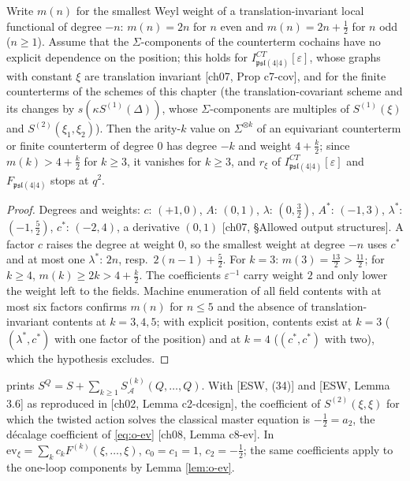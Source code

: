 \begin{lemma}
\label{lem:o-actiontrunc}
Write $m(n)$ for the smallest Weyl weight of a translation-invariant local functional of degree $-n$: $m(n)=2n$ for $n$ even and $m(n)=2n+\tfrac12$ for $n$ odd ($n\ge1$). Assume that the $\Sigma$-components of the counterterm cochains have no explicit dependence on the position; this holds for $I^{CT}_{\mathfrak{psl}(4|4)}[\varepsilon]$, whose graphs with constant $\xi$ are translation invariant [ch07, Prop c7-cov], and for the finite counterterms of the schemes of this chapter (the translation-covariant scheme and its changes by $s(\kappa S^{(1)}(\Delta))$, whose $\Sigma$-components are multiples of $S^{(1)}(\xi)$ and $S^{(2)}(\xi_1,\xi_2)$). Then the arity-$k$ value on $\Sigma^{\otimes k}$ of an equivariant counterterm or finite counterterm of degree $0$ has degree $-k$ and weight $4+\tfrac k2$; since $m(k)>4+\tfrac k2$ for $k\ge3$, it vanishes for $k\ge3$, and $r_\xi$ of $I^{CT}_{\mathfrak{psl}(4|4)}[\varepsilon]$ and $F_{\mathfrak{psl}(4|4)}$ stops at $q^2$.
\end{lemma}

\begin{proof}
Degrees and weights: $c$: $(+1,0)$, $A$: $(0,1)$, $\lambda$: $(0,\tfrac32)$, $A^*$: $(-1,3)$, $\lambda^*$: $(-1,\tfrac52)$, $c^*$: $(-2,4)$, a derivative $(0,1)$ [ch07, §Allowed output structures]. A factor $c$ raises the degree at weight $0$, so the smallest weight at degree $-n$ uses $c^*$ and at most one $\lambda^*$: $2n$, resp.\ $2(n-1)+\tfrac52$. For $k=3$: $m(3)=\tfrac{13}{2}>\tfrac{11}2$; for $k\ge4$, $m(k)\ge2k>4+\tfrac k2$. The coefficients $\varepsilon^{-1}$ carry weight $2$ and only lower the weight left to the fields. Machine enumeration of all field contents with at most six factors confirms $m(n)$ for $n\le5$ and the absence of translation-invariant contents at $k=3,4,5$; with explicit position, contents exist at $k=3$ ($(\lambda^*,c^*)$ with one factor of the position) and at $k=4$ ($(c^*,c^*)$ with two), which the hypothesis excludes.
\end{proof}

\begin{remark} prints $S^Q=S+\sum_{k\ge1}S^{(k)}_{\mathcal A}(Q,\dots,Q)$. With [ESW, (34)] and [ESW, Lemma 3.6] as reproduced in [ch02, Lemma c2-dcesign], the coefficient of $S^{(2)}(\xi,\xi)$ for which the twisted action solves the classical master equation is $-\tfrac12=a_2$, the décalage coefficient of \eqref{eq:o-ev} [ch08, Lemma c8-ev]. In $\mathrm{ev}_\xi=\sum_kc_kF^{(k)}(\xi,\dots,\xi)$, $c_0=c_1=1$, $c_2=-\tfrac12$; the same coefficients apply to the one-loop components by Lemma \ref{lem:o-ev}.
\end{remark}

